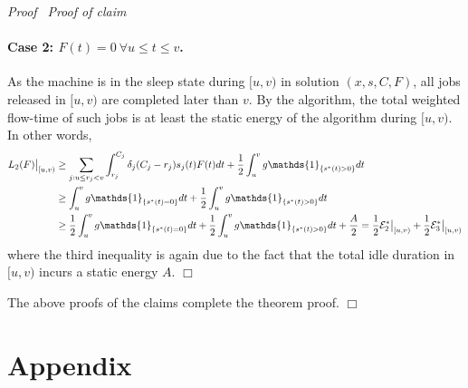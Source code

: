 \documentclass[11pt]{article}
\newenvironment{proof}{\noindent\emph{Proof\ }}{\hspace*{\fill}$\Box$\medskip}
\newenvironment{claimproof}{\noindent\emph{Proof of claim\ }}{\hspace*{\fill}$\Box$\medskip}
\newcommand\restr[2]{{\left.\kern-\nulldelimiterspace #1 \vphantom{\big|} \right|_{#2} }}
\newcommand{\one}{\ensuremath{\mathds{1}}}
\begin{document}
\begin{proof}
\begin{claimproof}
\paragraph{Case 2: $F(t) = 0 ~\forall u \leq t \leq v$.}  As the machine is in the sleep state 
during $[u,v)$ in solution $(x,s,C,F)$, all jobs 
released in $[u,v)$ are completed later than $v$. 
By the algorithm, the total weighted flow-time of such jobs is at least the static energy of the algorithm
during $[u,v)$. In other words,
\begin{align*}
\restr{L_{2}(F)}{[u,v)} &\geq \sum_{j: u \leq r_{j} < v} \int_{r_{j}}^{C_{j}}  \delta_{j}(C_{j} - r_{j}) s_{j}(t)F(t)dt  
		+ \frac{1}{2} \int_{u}^{v} g \one_{\{s^{*}(t) > 0\}} dt \\
& \geq \int_{u}^{v} g \one_{\{s^{*}(t) = 0\}} dt 
	      	+ \frac{1}{2} \int_{u}^{v}  g \one_{\{s^{*}(t) > 0\}}dt  \\
& \geq \frac{1}{2} \int_{u}^{v} g \one_{\{s^{*}(t) = 0\}} dt 
	      	+ \frac{1}{2} \int_{u}^{v}  g \one_{\{s^{*}(t) > 0\}}dt  + \frac{A}{2}
	        = \frac{1}{2} \restr{\mathcal{E}^{*}_{2}}{[u,v)} +  \frac{1}{2} \restr{\mathcal{E}^{*}_{3}}{[u,v)}
\end{align*}
where the third inequality is again due to the fact that 
the total idle duration in $[u,v)$ incurs a static energy $A$. 
\end{claimproof}

The above proofs of the claims complete the theorem proof.
\end{proof}




\newpage

\appendix

\section*{Appendix}
\end{document}

